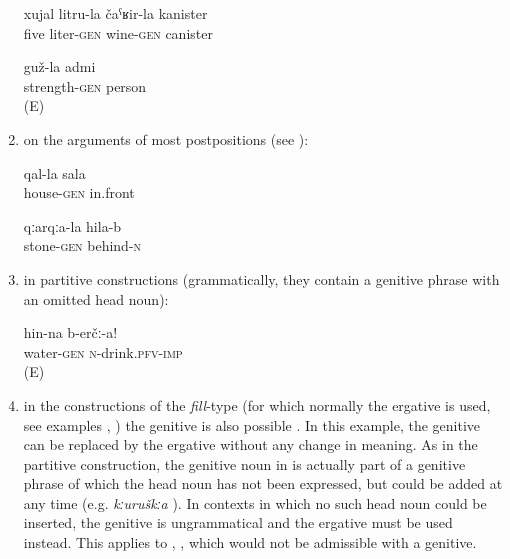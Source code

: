 \begin{enumerate}
\begin{exe}
		\ex	\label{ex:five liter canister of wine}
		\gll	xujal	litru-la		čaˁʁir-la	kanister\\
			five	liter-\textsc{gen}	wine-\textsc{gen}	canister\\
		\glt	{}

		\ex	\label{ex:strong person}
		\gll	guž-la	admi\\
			strength-\textsc{gen}	person\\
		\glt	{} (E)

	\end{exe}

	\item	on the arguments of most postpositions (see ):
	\begin{exe}
		\ex	\label{ex:in front of the house}
		\gll	qal-la sala\\
			house-\textsc{gen}	in.front\\
		\glt	{}

		\ex	\label{ex:behind the stone}
		\gll	qːarqːa-la	hila-b\\
			stone-\textsc{gen}	behind-\textsc{n}\\
		\glt	{}
	\end{exe}

	\item	in partitive constructions (grammatically, they contain a genitive phrase with an omitted head noun):
	\begin{exe}
		\ex	\label{ex:Drink (some) water}
		\gll	hin-na	b-erčː-a!\\
			water-\textsc{gen}	\textsc{n}-drink.\textsc{pfv}-\textsc{imp}\\
		\glt	\sqt{Drink (some) water!} (E)
	\end{exe}

\item	in the constructions of the \textit{fill}-type (for which normally the ergative is used, see examples , ) the genitive is also possible . In this example, the genitive can be replaced by the ergative without any change in meaning. As in the partitive construction, the genitive noun in  is actually part of a genitive phrase of which the head noun has not been expressed, but could be added at any time (e.g. \textit{kːuruškːa} ). In contexts in which no such head noun could be inserted, the genitive is ungrammatical and the ergative must be used instead. This applies to , , which would not be admissible with a genitive.


\end{enumerate}
